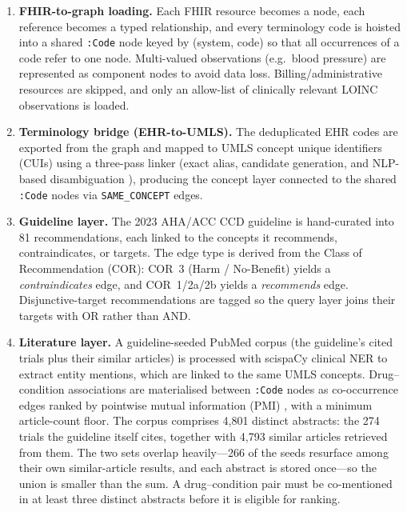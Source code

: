 \begin{enumerate}
    \item \textbf{FHIR-to-graph loading.} Each FHIR resource becomes a node, each reference
    becomes a typed relationship, and every terminology code is hoisted into a shared
    \texttt{:Code} node keyed by (system, code) so that all occurrences of a code refer to
    one node. Multi-valued observations (e.g.\ blood pressure) are represented as
    component nodes to avoid data loss. Billing/administrative resources are skipped, and
    only an allow-list of clinically relevant LOINC observations is loaded.
    \item \textbf{Terminology bridge (EHR-to-UMLS).} The deduplicated EHR codes are exported
    from the graph and mapped to UMLS \cite{umls} concept unique identifiers (CUIs) using a
    three-pass linker (exact alias, candidate generation, and NLP-based disambiguation
    \cite{scispacy}), producing the
    concept layer connected to the shared \texttt{:Code} nodes via \texttt{SAME\_CONCEPT}
    edges.
    \item \textbf{Guideline layer.} The 2023 AHA/ACC CCD guideline is hand-curated into
    81 recommendations, each linked to the concepts it recommends,
    contraindicates, or targets. The edge type is derived from the Class of Recommendation
    (COR): COR~3 (Harm / No-Benefit) yields a \emph{contraindicates} edge, and COR~1/2a/2b
    yields a \emph{recommends} edge. Disjunctive-target recommendations are tagged so the
    query layer joins their targets with OR rather than AND.
    \item \textbf{Literature layer.} A guideline-seeded PubMed corpus (the guideline's cited
    trials plus their similar articles) is processed with scispaCy clinical NER to extract
    entity mentions, which are linked to the same UMLS concepts. Drug--condition
    associations are materialised between \texttt{:Code} nodes as co-occurrence edges ranked
    by pointwise mutual information (PMI) \cite{pmi}, with a minimum article-count floor.
    The corpus comprises 4{,}801 distinct abstracts: the 274 trials the guideline
    itself cites, together with 4{,}793 similar articles retrieved from them. The two sets
    overlap heavily---266 of the seeds resurface among their own similar-article results, and
    each abstract is stored once---so the union is smaller than the sum. A drug--condition pair
    must be co-mentioned in at least three distinct abstracts before it is eligible for
    ranking.
\end{enumerate}

